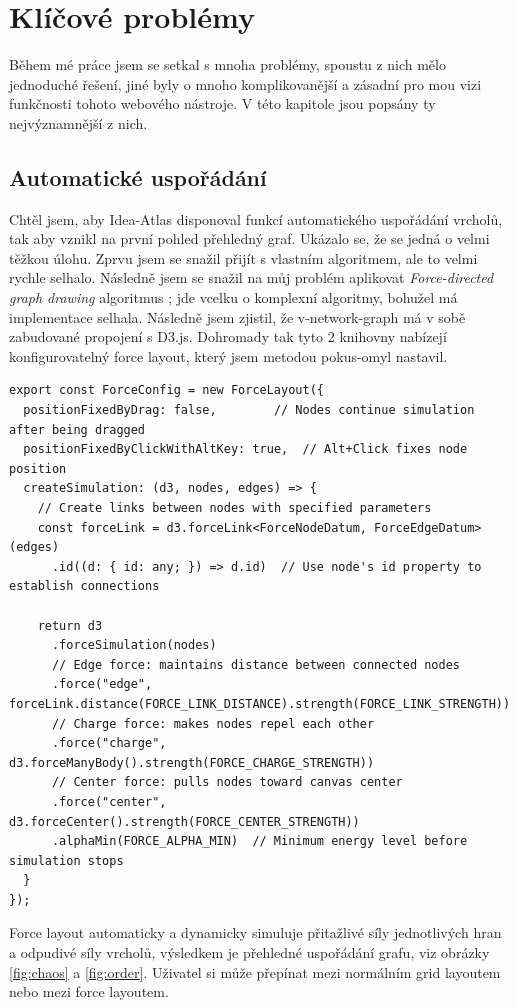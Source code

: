 \section{Klíčové problémy}
Během mé práce jsem se setkal s mnoha problémy, spoustu z nich mělo jednoduché řešení, jiné byly o mnoho komplikovanější a zásadní pro mou vizi funkčnosti tohoto webového nástroje. V této kapitole jsou popsány ty nejvýznamnější z nich.
\subsection{Automatické uspořádání}
Chtěl jsem, aby Idea-Atlas disponoval funkcí automatického uspořádání vrcholů, tak aby vznikl na první pohled přehledný graf. Ukázalo se, že se jedná o velmi těžkou úlohu. Zprvu jsem se snažil přijít s vlastním algoritmem, ale to velmi rychle selhalo. Následně jsem se snažil na můj problém aplikovat \textit{Force-directed graph drawing} algoritmus \cite{wikiforce}; jde vcelku o komplexní algoritmy, bohužel má implementace selhala. Následně jsem zjistil, že v-network-graph má v sobě zabudované propojení s D3.js. Dohromady tak tyto 2 knihovny nabízejí konfigurovatelný force layout, který jsem metodou pokus-omyl nastavil.
\begin{lstlisting}[style=JavaScript, firstnumber = 32, caption={config/mapNetworkConfig.ts, Implemetnace force layout},
label = {force}]
export const ForceConfig = new ForceLayout({
  positionFixedByDrag: false,        // Nodes continue simulation after being dragged
  positionFixedByClickWithAltKey: true,  // Alt+Click fixes node position
  createSimulation: (d3, nodes, edges) => {
    // Create links between nodes with specified parameters
    const forceLink = d3.forceLink<ForceNodeDatum, ForceEdgeDatum>(edges)
      .id((d: { id: any; }) => d.id)  // Use node's id property to establish connections
    
    return d3
      .forceSimulation(nodes)
      // Edge force: maintains distance between connected nodes
      .force("edge", forceLink.distance(FORCE_LINK_DISTANCE).strength(FORCE_LINK_STRENGTH))
      // Charge force: makes nodes repel each other
      .force("charge", d3.forceManyBody().strength(FORCE_CHARGE_STRENGTH))
      // Center force: pulls nodes toward canvas center
      .force("center", d3.forceCenter().strength(FORCE_CENTER_STRENGTH))
      .alphaMin(FORCE_ALPHA_MIN)  // Minimum energy level before simulation stops
  }
});
\end{lstlisting}
\newpage
Force layout automaticky a dynamicky simuluje přitažlivé síly jednotlivých hran a odpudivé síly vrcholů, výsledkem je přehledné uspořádání grafu, viz obrázky \ref{fig:chaos} a \ref{fig:order}. Uživatel si může přepínat mezi normálním grid layoutem nebo mezi force layoutem. 
